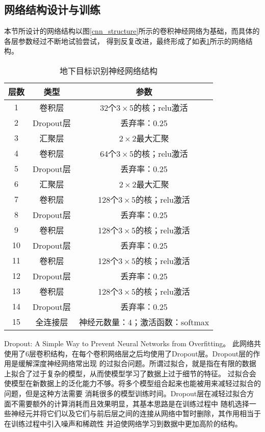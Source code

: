 \subsection{网络结构设计与训练}
本节所设计的网络结构以图\ref{cnn_structure}所示的卷积神经网络为基础，而具体的各层参数经过不断地试验尝试，
得到反复改进，最终形成了如表\ref{table_network_structure}所示的网络结构。
\begin{table}[h]
	\caption{地下目标识别神经网络结构} 
	\begin{tabular}{|c|c|c|} 
		\hline  
		层数 &  类型 & 参数\\
		\hline 
		1 & 卷积层 & 32个$3\times 5$的核；relu激活\\  
		\hline  
		2 & Dropout层 & 丢弃率：0.25\\
		\hline
		3 & 汇聚层 & $2\times 2$最大汇聚\\
		\hline
		4 & 卷积层 & 64个$3\times 5$的核；relu激活\\  
		\hline  
		5 & Dropout层 & 丢弃率：0.25\\
		\hline
		6 & 汇聚层 & $2\times 2$最大汇聚\\
		\hline
		7 & 卷积层 & 128个$3\times 5$的核；relu激活\\
		\hline  
		8 & Dropout层 & 丢弃率：0.25\\
		\hline
		9 & 卷积层 & 128个$3\times 5$的核；relu激活\\
		\hline  
		10 & Dropout层 & 丢弃率：0.25\\
		\hline
		11 & 卷积层 & 128个$3\times 5$的核；relu激活\\
		\hline  
		12 & Dropout层 & 丢弃率：0.25\\
		\hline
		13 & 卷积层 & 128个$3\times 5$的核；relu激活\\
		\hline  
		14 & Dropout层 & 丢弃率：0.25\\
		\hline
		15 & 全连接层 & 神经元数量：4；激活函数：softmax\\
		\hline  
	\end{tabular}
	\label{table_network_structure}
\end{table}

Dropout: A Simple Way to Prevent Neural Networks from Overfitting。
此网络共使用了6层卷积结构，在每个卷积网络层之后均使用了Dropout层。Dropout层的作用是缓解深度神经网络常出现
的过拟合问题。所谓过拟合，就是指在有限的数据上拟合了过于复杂的模型，从而使模型学习了数据上过于细节的特征。
过拟合会使模型在新数据上的泛化能力不够。将多个模型组合起来也能被用来减轻过拟合的问题，但是这种方法需要
消耗很多的模型训练时间。Dropout层在减轻过拟合方面不需要额外的计算消耗而且效果明显，其基本思路是在训练过程中
随机选择一些神经元并将它们以及它们与前后层之间的连接从网络中暂时删除，其作用相当于在训练过程中引入噪声和稀疏性
并迫使网络学习到数据中更加高阶的结构。

